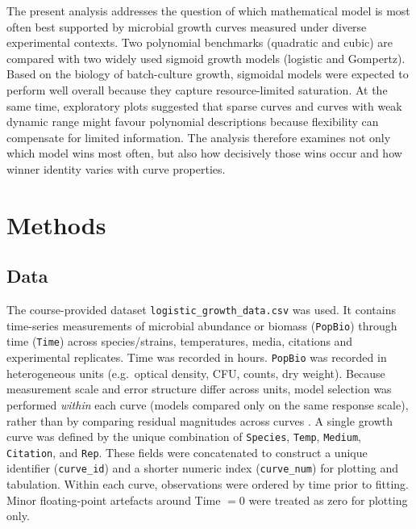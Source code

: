 \documentclass[11pt]{article}
\begin{document}
The present analysis addresses the question of which mathematical model is most often best supported by microbial growth curves measured under diverse experimental contexts. Two polynomial benchmarks (quadratic and cubic) are compared with two widely used sigmoid growth models (logistic and Gompertz). Based on the biology of batch-culture growth, sigmoidal models were expected to perform well overall because they capture resource-limited saturation. At the same time, exploratory plots suggested that sparse curves and curves with weak dynamic range might favour polynomial descriptions because flexibility can compensate for limited information. The analysis therefore examines not only which model wins most often, but also how decisively those wins occur and how winner identity varies with curve properties.
\section*{Methods}
\subsection*{Data}
The course-provided dataset \texttt{logistic\_growth\_data.csv} was used. It contains time-series measurements of microbial abundance or biomass (\texttt{PopBio}) through time (\texttt{Time}) across species/strains, temperatures, media, citations and experimental replicates. Time was recorded in hours. \texttt{PopBio} was recorded in heterogeneous units (e.g.\ optical density, CFU, counts, dry weight). Because measurement scale and error structure differ across units, model selection was performed \emph{within} each curve (models compared only on the same response scale), rather than by comparing residual magnitudes across curves \citep{BurnhamAnderson2002,JohnsonOmland2004}.
A single growth curve was defined by the unique combination of \texttt{Species}, \texttt{Temp}, \texttt{Medium}, \texttt{Citation}, and \texttt{Rep}. These fields were concatenated to construct a unique identifier (\texttt{curve\_id}) and a shorter numeric index (\texttt{curve\_num}) for plotting and tabulation. Within each curve, observations were ordered by time prior to fitting. Minor floating-point artefacts around Time \(=0\) were treated as zero for plotting only.
\end{document}

